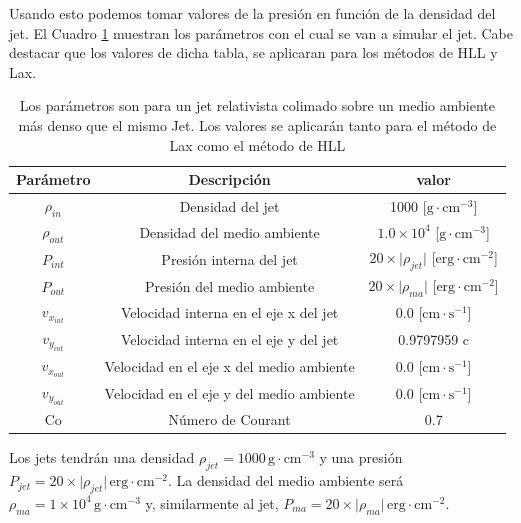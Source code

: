 \documentclass[12pt,a4paper]{book}
\begin{document}
Usando esto podemos tomar valores de la presión en función de la densidad del jet.  El Cuadro \ref{Cuadro: propiedades-jet-comparacion} muestran los parámetros con el cual se van a simular el jet. Cabe destacar que los valores de dicha tabla, se aplicaran para los métodos de HLL y Lax.

\begin{table}[htbp]
\begin{center}
\begin{tabular}{|c|c|c|}
\hline 
\textbf{Parámetro} & \textbf{Descripción} & \textbf{valor} \\ 
\hline 
$\rho_{in}$ &  Densidad del jet & 1000 [$\mathrm{g} \cdot \mathrm{cm}^{-3}$] \\ 
\hline 
$\rho_{out}$ &  Densidad del medio ambiente & $1.0 \times 10^{4}$  [$\mathrm{g} \cdot \mathrm{cm}^{-3}$] \\
\hline 
$P_{int}$ & Presión interna del jet& $20 \times \lvert \rho_{jet} \lvert$ [$ \mathrm{erg}\cdot \mathrm{cm}^{-2}$]\\ 
\hline 
$P_{out}$ &  Presión del medio ambiente & $20 \times \lvert \rho_{ma} \lvert$ [$\mathrm{erg}\cdot \mathrm{cm}^{-2}$] \\ 
\hline 
$v_{x_{int}}$ & Velocidad interna en el eje x del jet & 0.0 [$\mathrm{cm}\cdot \mathrm{s}^{-1}$]\\ 
\hline 
$v_{y_{int}}$ & Velocidad interna en el eje y del jet & 0.9797959 c \\ 
\hline 
$v_{x_{out}}$ & Velocidad en el eje x del medio ambiente & 0.0 [$\mathrm{cm}\cdot \mathrm{s}^{-1}$] \\
\hline 
$v_{y_{out}}$ & Velocidad en el eje y del medio ambiente & 0.0 [$\mathrm{cm}\cdot \mathrm{s}^{-1}$]\\ 
\hline 
Co & Número de Courant & 0.7 \\ 
\hline 
\end{tabular}
\caption{\label{Cuadro: propiedades-jet-comparacion}Los parámetros son para un jet relativista colimado sobre un medio ambiente más denso que el mismo Jet. Los valores se aplicarán tanto para el método de Lax como el método de HLL}
\end{center}
\end{table}


Los jets tendrán una densidad $\rho_{jet} = 1000 \, \mathrm{g} \cdot \mathrm{cm}^{-3}$ y una presión $P_{jet} = 20 \times \lvert \rho_{jet} \rvert \, \mathrm{erg} \cdot \mathrm{cm}^{-2}$. La densidad del medio ambiente será $\rho_{ma} = 1 \times 10^{4} \, \mathrm{g} \cdot \mathrm{cm}^{-3}$ y, similarmente al jet, $P_{ma} = 20 \times \lvert \rho_{ma} \rvert \, \mathrm{erg} \cdot \mathrm{cm}^{-2}$.
\end{document}
